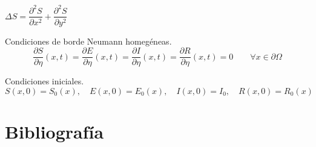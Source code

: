 \documentclass[a4paper, 10pt, twoside]{article}
\begin{document}
$\Delta S = \dfrac{\partial^2 S}{\partial x^2} + \dfrac{\partial^2 S}{\partial y^2}$

Condiciones de borde Neumann homegéneas.
\begin{equation}
\frac{\partial S}{\partial \eta}( x, t ) = 
\frac{\partial E}{\partial \eta}( x, t ) = 
\frac{\partial I}{\partial \eta}( x, t ) = 
\frac{\partial R}{\partial \eta}( x, t ) = 0 \qquad \forall x \in \partial \Omega
\end{equation}

Condiciones iniciales.
\begin{equation}
S( x, 0 ) = S_0( x ),\quad E( x, 0 ) = E_0( x ),\quad I( x, 0 ) = I_0,\quad R( x, 0 ) = R_0( x )
\end{equation}

\clearpage
\textcite{accu_stab_num_alg, fun_ergo_theo, pde_evans, trans_equ_bio_2007, 
	real_comp_ana_1987, func_ana_1987}

\section{Bibliografía}
\printbibliography[heading = none]
 
\end{document}
